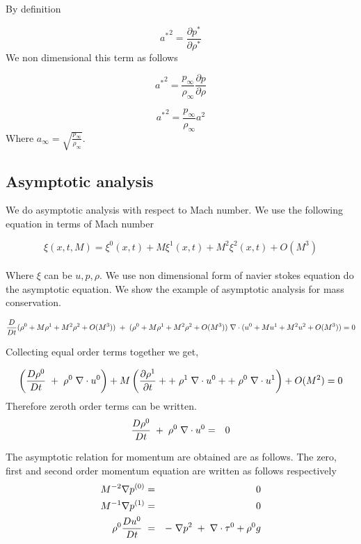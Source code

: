 \noindent By definition 

$${a^*}^2= \frac{\partial p^*}{\partial \rho^*}$$ We non dimensional this term as follows 

$${a^*}^2= \frac{p_\infty}{\rho_\infty}\frac{\partial p}{\partial \rho}$$

$${a^*}^2= \frac{p_\infty}{\rho_\infty}a^2$$ Where $a_\infty = \sqrt{\frac{p_\infty}{\rho_\infty}}$.

\subsection{Asymptotic analysis}
We do asymptotic analysis with respect to Mach number.
We use the following equation in terms of Mach number

$$\xi(x,t,M)=\xi^0(x,t)+M \xi^1(x,t)+M^2 \xi^2(x,t)+O(M^3)$$ \\

\noindent Where $\xi$ can be $u,p,\rho$. We use non dimensional form of navier stokes equation do the asymptotic equation. 
We show the example of asymptotic analysis for mass conservation. 

$$\frac{D}{D t}(\rho^0+M \rho^1+M^2 \rho^2+O(M^3))\hspace{1mm}+\hspace{1mm}(\rho^0+M \rho^1+M^2 \rho^2+O(M^3)) \hspace{1mm}\nabla \cdot (u^0+M u^1+M^2 u^2+O(M^3)) = 0 $$

Collecting equal order terms together we get,

$$\left(\frac{D \rho^0}{D t}\hspace{1mm}+\hspace{1mm}\rho^0 \hspace{1mm}\nabla \cdot u^0\right) + M \left(\frac{\partial \rho^1 }{\partial t}+ +\hspace{1mm}\rho^1 \hspace{1mm}\nabla \cdot u^0++\hspace{1mm}\rho^0 \hspace{1mm}\nabla \cdot u^1\right) + O(M^2) = 0 $$ Therefore zeroth order terms can be written.
\begin{eqnarray}
\frac{D \rho^0}{D t}\hspace{1mm}+\hspace{1mm}\rho^0 \hspace{1mm}\nabla \cdot u^0 &=& 0
\end{eqnarray}

\noindent The asymptotic relation for momentum are obtained are as follows.  The zero, first and second order momentum equation are written as follows respectively
\begin{eqnarray}
M^{-2}\nabla p^{(0)} &=& 0\\
M^{-1}\nabla p^{(1)} &=& 0\\
\rho^0 \frac{D u^0}{D t} \hspace{1mm} &=& -\hspace{1mm}\nabla p^2\hspace{1mm}+\hspace{1mm}\nabla \cdot \tau^0 + \rho^0 g
\end{eqnarray}

